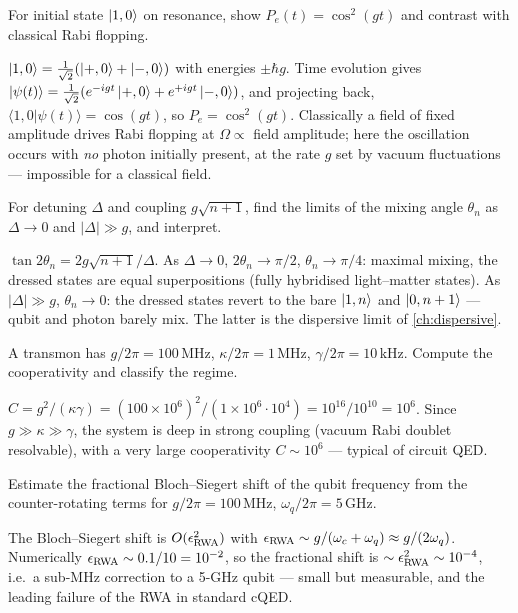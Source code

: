 \begin{exercise}
For initial state $\ket{1,0}$ on resonance, show
$P_e(t)=\cos^2(gt)$ and contrast with classical Rabi flopping.
\begin{solution}
$\ket{1,0}=\tfrac1{\sqrt2}(\ket{+,0}+\ket{-,0})$ with energies
$\pm\hbar g$. Time evolution gives
$\ket{\psi(t)}=\tfrac1{\sqrt2}(e^{-igt}\ket{+,0}+e^{+igt}\ket{-,0})$,
and projecting back, $\langle1,0|\psi(t)\rangle=\cos(gt)$, so
$P_e=\cos^2(gt)$. Classically a field of fixed amplitude drives Rabi
flopping at $\Omega\propto$ field amplitude; here the oscillation
occurs with \emph{no} photon initially present, at the rate $g$ set
by vacuum fluctuations --- impossible for a classical field.
\end{solution}
\end{exercise}

\begin{exercise}
For detuning $\Delta$ and coupling $g\sqrt{n+1}$, find the limits of
the mixing angle $\theta_n$ as $\Delta\to0$ and $|\Delta|\gg g$, and
interpret.
\begin{solution}
$\tan2\theta_n=2g\sqrt{n+1}/\Delta$. As $\Delta\to0$,
$2\theta_n\to\pi/2$, $\theta_n\to\pi/4$: maximal mixing, the dressed
states are equal superpositions (fully hybridised light--matter
states). As $|\Delta|\gg g$, $\theta_n\to0$: the dressed states
revert to the bare $\ket{1,n}$ and $\ket{0,n+1}$ --- qubit and
photon barely mix. The latter is the dispersive limit of
\cref{ch:dispersive}.
\end{solution}
\end{exercise}

\begin{exercise}
A transmon has $g/2\pi=100\,$MHz, $\kappa/2\pi=1\,$MHz,
$\gamma/2\pi=10\,$kHz. Compute the cooperativity and classify the
regime.
\begin{solution}
$C=g^2/(\kappa\gamma)=(100\times10^6)^2/(1\times10^6\cdot10^4)
=10^{16}/10^{10}=10^6$. Since $g\gg\kappa\gg\gamma$, the system is
deep in strong coupling (vacuum Rabi doublet resolvable), with a
very large cooperativity $C\sim10^6$ --- typical of circuit QED.
\end{solution}
\end{exercise}

\begin{exercise}
Estimate the fractional Bloch--Siegert shift of the qubit frequency
from the counter-rotating terms for $g/2\pi=100\,$MHz,
$\omega_q/2\pi=5\,$GHz.
\begin{solution}
The Bloch--Siegert shift is $O(\epsilon_{\rm RWA}^2)$ with
$\epsilon_{\rm RWA}\sim g/(\omega_c+\omega_q)\approx g/(2\omega_q)$.
Numerically $\epsilon_{\rm RWA}\sim0.1/10=10^{-2}$, so the
fractional shift is $\sim\epsilon_{\rm RWA}^2\sim10^{-4}$, i.e.\ a
sub-MHz correction to a 5-GHz qubit --- small but measurable, and
the leading failure of the RWA in standard cQED.
\end{solution}
\end{exercise}

